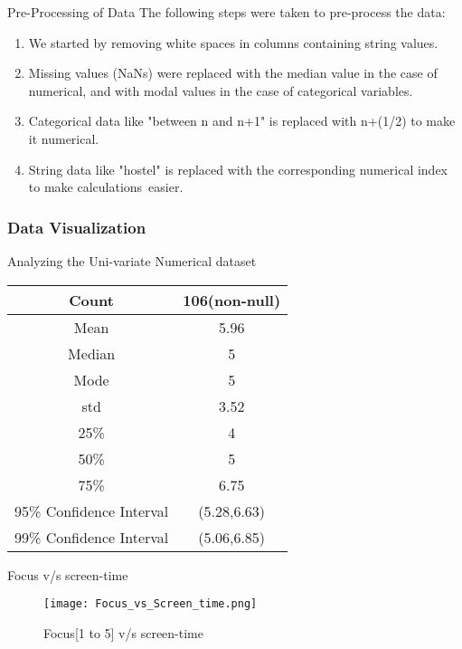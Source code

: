 \documentclass{beamer}
\begin{document}
\begin{frame}
\begin{block}{Pre-Processing of Data}
The following steps were taken to pre-process the data:
\begin{enumerate}
\item We started by removing white spaces in columns containing string values.
\item Missing values (NaNs) were replaced with the median value in the case of numerical, and with modal values in the case of categorical variables.
\item Categorical data like "between n and n+1" is replaced with n+(1/2) to make it numerical.
\item String data like "hostel" is replaced with the corresponding numerical index to make calculations easier.
\end{enumerate}
\end{block}
    
\end{frame}

\begin{frame}
\frametitle{Data Visualization}
\begin{block}{Analyzing the Uni-variate Numerical dataset}
\begin{center}
\begin{tabular}{|c|c|}
\hline 
Count & 106(non-null) \\ 
\hline 
Mean & 5.96 \\ 
\hline 
Median & 5 \\ 
\hline 
Mode & 5 \\ 
\hline 
std & 3.52 \\ 
\hline 
25\% & 4 \\ 
\hline 
50\% & 5 \\ 
\hline 
75\% & 6.75 \\ 
\hline 
95\% Confidence Interval & (5.28,6.63) \\ 
\hline
99\% Confidence Interval & (5.06,6.85) \\ 
\hline
\end{tabular} 
\end{center}
\end{block}
\end{frame}

\begin{frame}
\begin{block}{Focus v/s screen-time}
\begin{figure}[hbtp]
\caption{Focus[1 to 5] v/s screen-time}
\centering
\texttt{[image: Focus\_vs\_Screen\_time.png]}
\end{figure}
\end{block}
\end{frame}
\end{document}
